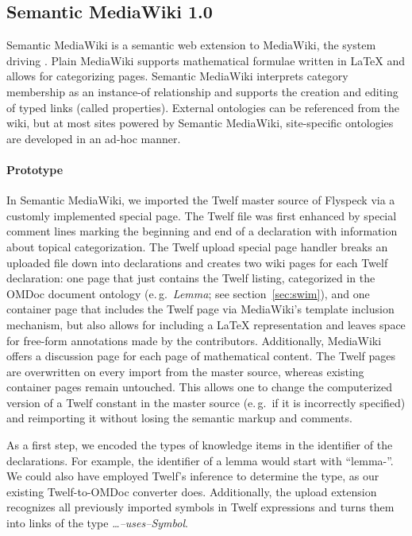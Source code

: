 \subsection{Semantic MediaWiki 1.0}
\label{sec:smw-study}

Semantic MediaWiki\cite{KrSchVr:semwiki-reasoning07} is a semantic web extension
to MediaWiki, the system driving .  Plain MediaWiki supports
mathematical formulae written in {\LaTeX} and allows for categorizing pages.
Semantic MediaWiki interprets category membership as an instance-of relationship
and supports the creation and editing of typed links (called properties).
External ontologies can be referenced from the wiki, but at most sites powered
by Semantic MediaWiki, site-specific ontologies are developed in an ad-hoc
manner\cite{ontoworld:sites-using-smw}.

\paragraph{Prototype} In Semantic MediaWiki, we imported the Twelf master source
of Flyspeck via a customly implemented special page.  The Twelf file was first
enhanced by special comment lines marking the beginning and end of a declaration
with information about topical categorization.  The Twelf upload special page
handler breaks an uploaded file down into declarations and creates two wiki
pages for each Twelf declaration: one page that just contains the Twelf listing,
categorized in the OMDoc document ontology (e.\,g.\ \textit{Lemma}; see
section~\ref{sec:swim}), and one container page that includes the Twelf page via
MediaWiki's template inclusion mechanism, but also allows for including a
{\LaTeX} representation and leaves space for free-form annotations made by the
contributors.  Additionally, MediaWiki offers a discussion page for each page of
mathematical content.  The Twelf pages are overwritten on every import from the
master source, whereas existing container pages remain untouched.  This allows
one to change the computerized version of a Twelf constant in the master source
(e.\,g.\ if it is incorrectly specified) and reimporting it without losing the
semantic markup and comments.

As a first step, we encoded the types of knowledge items in the identifier of
the declarations.  For example, the identifier of a lemma would start with
``lemma-''.  We could also have employed Twelf's inference to determine the
type, as our existing Twelf-to-OMDoc converter does.  Additionally, the
upload extension recognizes all previously imported symbols in Twelf expressions
and turns them into links of the type \textit{\ldots--uses--Symbol}.

